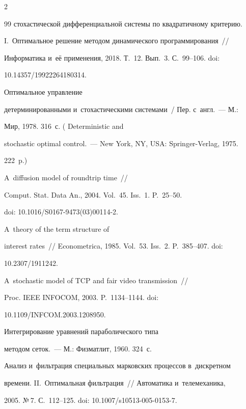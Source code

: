 \begin{multicols}{2}
{{\begin{thebibliography}{99}
стохастической дифференциальной системы по квад\-ра\-тич\-но\-му критерию. 


I.~Оптимальное решение методом динамического программирования~// 


Информатика и~её применения, 2018. Т.~12. Вып.~3. С.~99--106. doi: 


10.14357/19922264180314.




 Оптимальное управление 


детерминированными и~стохастическими системами~/ Пер. с~англ.~--- М.: 


Мир, 1978. 316~с. ( Deterministic and 


stochastic optimal control.~--- New York, NY, USA: Springer-Verlag, 1975. 


222~p.)




 A~diffusion model of roundtrip time~// 


Comput. Stat. Data An., 2004. Vol.~45. Iss.~1. P.~25--50. 


doi: 10.1016/S0167-9473(03)00114-2.




 A~theory of the term structure of 


interest rates~// Econometrica, 1985. Vol.~53. Iss.~2. P.~385--407. doi: 


10.2307/1911242.




 A~stochastic model of TCP and fair video transmission~// 


Proc. IEEE INFOCOM, 2003. P.~1134--1144. doi: 


10.1109/INFCOM.2003.1208950.




 Интегрирование уравнений параболического типа 


методом сеток.~--- М.: Физматлит, 1960. 324~с.






Анализ и~фильтрация специальных марковских процессов в~дискретном 


времени. II.~Оптимальная фильтрация~// Автоматика и~телемеханика, 


2005. №\,7. С.~112--125. doi: 10.1007/s10513-005-0153-7.



\end{thebibliography}}}
\end{multicols}
